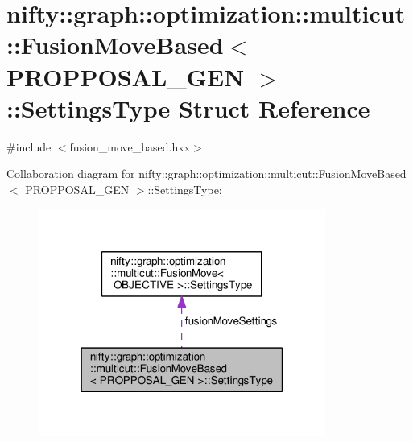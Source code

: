 \hypertarget{structnifty_1_1graph_1_1optimization_1_1multicut_1_1FusionMoveBased_1_1SettingsType}{}\section{nifty\+:\+:graph\+:\+:optimization\+:\+:multicut\+:\+:Fusion\+Move\+Based$<$ P\+R\+O\+P\+P\+O\+S\+A\+L\+\_\+\+G\+E\+N $>$\+:\+:Settings\+Type Struct Reference}
\label{structnifty_1_1graph_1_1optimization_1_1multicut_1_1FusionMoveBased_1_1SettingsType}


{\ttfamily \#include $<$fusion\+\_\+move\+\_\+based.\+hxx$>$}



Collaboration diagram for nifty\+:\+:graph\+:\+:optimization\+:\+:multicut\+:\+:Fusion\+Move\+Based$<$ P\+R\+O\+P\+P\+O\+S\+A\+L\+\_\+\+G\+E\+N $>$\+:\+:Settings\+Type\+:\nopagebreak
\begin{figure}[H]
\begin{center}
\leavevmode
\includegraphics[width=267pt]{structnifty_1_1graph_1_1optimization_1_1multicut_1_1FusionMoveBased_1_1SettingsType__coll__graph}
\end{center}
\end{figure}
